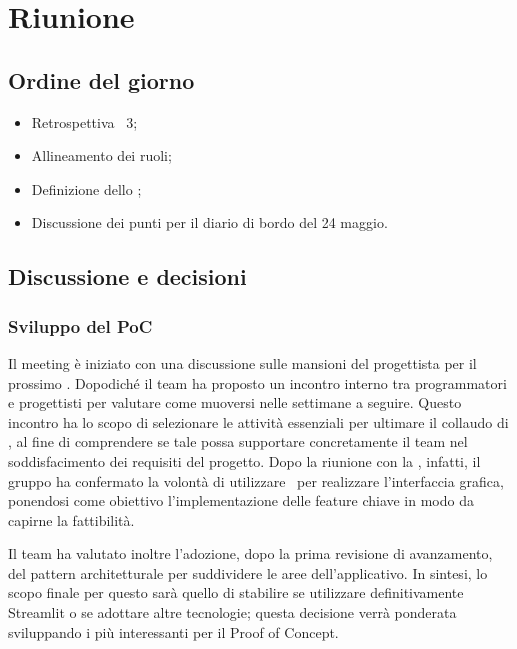 \section{Riunione}
\subsection{Ordine del giorno}
\begin{itemize}
	\item Retrospettiva \ 3;
	\item Allineamento dei ruoli;
	\item Definizione dello ;
	\item Discussione dei punti per il diario di bordo del 24 maggio.
\end{itemize}

\subsection{Discussione e decisioni}
\subsubsection{Sviluppo del PoC}
\par Il meeting è iniziato con una discussione sulle mansioni del progettista per il prossimo . 
Dopodiché il team ha proposto un incontro interno tra programmatori e progettisti per valutare come muoversi nelle settimane a seguire. 
Questo incontro ha lo scopo di selezionare le attività essenziali per ultimare il collaudo di , al fine di comprendere se tale  possa supportare concretamente il team nel soddisfacimento dei requisiti del progetto.
Dopo la riunione con la , infatti, il gruppo ha confermato la volontà di utilizzare \ per realizzare l'interfaccia grafica, ponendosi come obiettivo l'implementazione delle feature chiave in modo da capirne la fattibilità.
\par Il team ha valutato inoltre l'adozione, dopo la prima revisione di avanzamento, del pattern architetturale  per suddividere le aree dell'applicativo. 
In sintesi, lo scopo finale per questo  sarà quello di stabilire se utilizzare definitivamente Streamlit o se adottare altre tecnologie; questa decisione verrà ponderata sviluppando i  più interessanti per il Proof of Concept.
